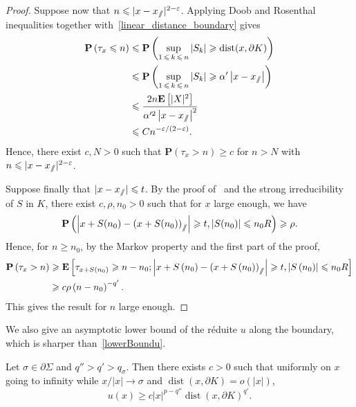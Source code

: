 \documentclass[AHL,Unicode,longabstracts,published]{cedram}
\DeclareMathOperator{\dist}{dist}
\newcommand{\pr}{\mathbf{P}}
\newcommand{\e}{\mathbf{E}}
\renewcommand{\epsilon}{\varepsilon}
\renewcommand{\leq}{\leqslant}
\renewcommand{\geq}{\geqslant}
\newcommand{\sslash}{\slash\mkern-6.4mu\slash}
\begin{document}
\begin{proof}
Suppose now that $n\leq | x-x_{\sslash}|^{2-\epsilon}$. Applying Doob and Rosenthal inequalities together with~\eqref{linear_distance_boundary} gives
\begin{align*}
\pr\left(\tau_{x}\leq n\right)&\leq \pr\left(\sup_{1\,\leq\,k\,\leq\,n} |S_{k}|\geq \dist(x,\partial K)\right)\\
&\leq \pr\left(\sup_{1\,\leq\,k\,\leq\,n} |S_{k}|\geq \alpha'\left|x-x_{\sslash}\right|\right)\\
&\leq \frac{2n\e\left[|X|^{2}\right]}{\alpha'^{2}\left|x-x_{\sslash}\right|^{2}}\\
&\leq Cn^{-\epsilon/(2-\epsilon)}.
\end{align*}
Hence, there exist $c,N>0$ such that $\pr(\tau_{x}> n)\geq c$ for $n>N$ with $n\leq| x-x_{\sslash}|^{2-\epsilon}$.

Suppose finally that $|x-x_{\sslash}|\leq t$. By the proof of~\cite[Lemma~14]{DeWa-15} and the strong irreducibility of $S$ in $K$, there exist $c,\rho,n_{0}>0$ such that for $x$ large enough, we have
\[
\pr\left(\left| x+S(n_{0})-\left(x+S(n_{0})\right)_{\sslash}\right|\geq t, \left|S(n_{0})\right|\leq n_{0}R\right)\geq \rho.
\]
Hence, for $n\geq n_{0}$, by the Markov property and the first part of the proof,
\begin{align*}
\pr\left(\tau_{x}>n\right)&\geq \e\left[\tau_{x+S(n_{0})}\geq n-n_{0};\left| x+S\left(n_{0}\right)-\left(x+S\left(n_{0}\right)\right)_{\sslash}\right|\geq t, \left| S\left(n_{0}\right)\right|\leq n_{0}R\right]\\
&\geq c\rho \left(n-n_{0}\right)^{-q'}.
\end{align*}
This gives the result for $n$ large enough.
\end{proof}

We also give an asymptotic lower bound of the réduite $u$ along the boundary, which is sharper than~\eqref{lowerBoundu}.

\begin{lemm}\label{lower_bound_u_tangent}
Let $\sigma\in \partial \Sigma$ and $q''>q'>q_{\sigma}$. Then there exists $c>0$ such that uniformly on $x$ going to infinity while $x/| x|\rightarrow \sigma$ and $\dist(x,\partial K)=o(| x|)$,
\[
u(x)\geq c|x|^{p-q''}\dist(x,\partial K)^{q'}.
\]
\end{lemm}
\end{document}
